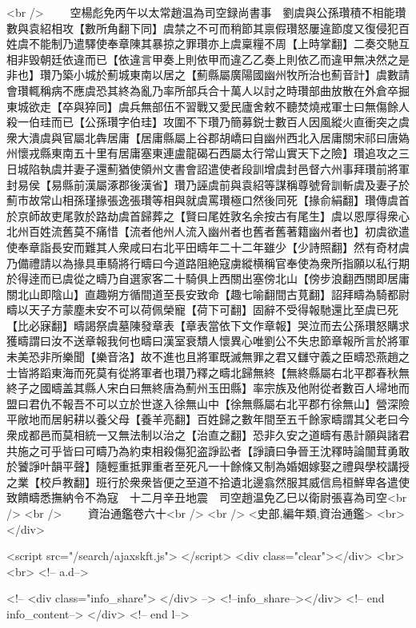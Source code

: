 <br />
　　空楊彪免丙午以太常趙温為司空録尚書事　劉虞與公孫瓚積不相能瓚數與袁紹相攻【數所角翻下同】虞禁之不可而稍節其禀假瓚怒屢違節度又復侵犯百姓虞不能制乃遣驛使奉章陳其暴掠之罪瓚亦上虞稟糧不周【上時掌翻】二奏交馳互相非毁朝廷依違而已【依違言甲奏上則依甲而違乙乙奏上則依乙而違甲無决然之是非也】瓚乃築小城於薊城東南以居之【薊縣屬廣陽國幽州牧所治也薊音計】虞數請會瓚輒稱病不應虞恐其終為亂乃率所部兵合十萬人以討之時瓚部曲放散在外倉卒掘東城欲走【卒與猝同】虞兵無部伍不習戰又愛民廬舍敕不聽焚燒戒軍士曰無傷餘人殺一伯珪而已【公孫瓚字伯珪】攻圍不下瓚乃簡募鋭士數百人因風縱火直衝突之虞衆大潰虞與官屬北犇居庸【居庸縣屬上谷郡胡嶠曰自幽州西北入居庸關宋祁曰唐媯州懷戎縣東南五十里有居庸塞東連盧龍碣石西屬太行常山實天下之險】瓚追攻之三日城陷執虞并妻子還薊猶使領州文書會詔遣使者段訓增虞封邑督六州事拜瓚前將軍封易侯【易縣前漢屬涿郡後漢省】瓚乃誣虞前與袁紹等謀稱尊號脅訓斬虞及妻子於薊市故常山相孫瑾掾張逸張瓚等相與就虞罵瓚極口然後同死【掾俞絹翻】瓚傳虞首於京師故吏尾敦於路劫虞首歸葬之【賢曰尾姓敦名余按古有尾生】虞以恩厚得衆心北州百姓流舊莫不痛惜【流者他州人流入幽州者也舊者舊著籍幽州者也】初虞欲遣使奉章詣長安而難其人衆咸曰右北平田疇年二十二年雖少【少詩照翻】然有奇材虞乃備禮請以為掾具車騎將行疇曰今道路阻絶寇虜縱横稱官奉使為衆所指願以私行期於得逹而已虞從之疇乃自選家客二十騎俱上西關出塞傍北山【傍步浪翻西關即居庸關北山即陰山】直趣朔方循間道至長安致命【趣七喻翻間古莧翻】詔拜疇為騎都尉疇以天子方蒙塵未安不可以荷佩榮寵【荷下可翻】固辭不受得報馳還比至虞已死【比必寐翻】疇謁祭虞墓陳發章表【章表當依下文作章報】哭泣而去公孫瓚怒購求獲疇謂曰汝不送章報我何也疇曰漢室衰穨人懷異心唯劉公不失忠節章報所言於將軍未美恐非所樂聞【樂音洛】故不進也且將軍既滅無罪之君又讎守義之臣疇恐燕趙之士皆將蹈東海而死莫有從將軍者也瓚乃釋之疇北歸無終【無終縣屬右北平郡春秋無終子之國疇盖其縣人宋白曰無終唐為薊州玉田縣】率宗族及他附從者數百人埽地而盟曰君仇不報吾不可以立於世遂入徐無山中【徐無縣屬右北平郡冇徐無山】營深險平敞地而居躬耕以養父母【養羊亮翻】百姓歸之數年間至五千餘家疇謂其父老曰今衆成都邑而莫相統一又無法制以治之【治直之翻】恐非久安之道疇有愚計願與諸君共施之可乎皆曰可疇乃為約束相殺傷犯盗諍訟者【諍讀曰争晉王沈釋時論闟茸勇敢於饕諍叶韻平聲】隨輕重抵罪重者至死凡一十餘條又制為婚姻嫁娶之禮與學校講授之業【校戶教翻】班行於衆衆皆便之至道不拾遺北邊翕然服其威信烏桓鮮卑各遣使致饋疇悉撫納令不為寇　十二月辛丑地震　司空趙温免乙巳以衛尉張喜為司空<br />
<br />
　　資治通鑑卷六十<br />
<br />
<史部,編年類,資治通鑑>  <br>
   </div> 

<script src="/search/ajaxskft.js"> </script>
 <div class="clear"></div>
<br>
<br>
 <!-- a.d-->

 <!--
<div class="info_share">
</div> 
-->
 <!--info_share--></div>   <!-- end info_content-->
  </div> <!-- end l-->

